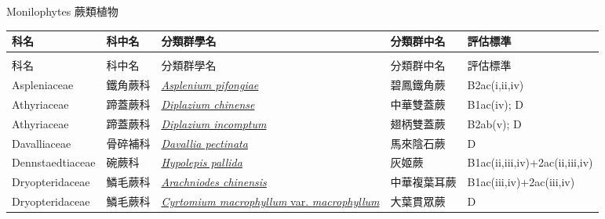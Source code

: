 \noindent\normalfont\selectfont Monilophytes 蕨類植物
\footnotesize\selectfont
        {\def\arraystretch{1.5}\tabcolsep=2pt
        \begin{longtable}{p{2.5cm}p{2.5cm}p{4.5cm}p{2.5cm}p{3cm}}
        \toprule
          科名 & 科中名 & 分類群學名 & 分類群中名 & 評估標準 \\
        \midrule 
        \endfirsthead

        \multicolumn{4}{l}{\bfseries\Large\color{red}{國家瀕危 (NEN) 類別維管束植物名錄(續)}} \\
        \toprule
        科名 & 科中名 & 分類群學名 & 分類群中名 & 評估標準 \\
        \midrule
        \endhead
                Aspleniaceae & 鐵角蕨科 & \href{http://www.theplantlist.org/tpl1.1/search?q=Asplenium+pifongiae}{\textit{Asplenium pifongiae} } & 碧鳳鐵角蕨 & B2ac(i,ii,iv) \index{Asplenium@\textit{Asplenium}!pifongiae@\textit{pifongiae}}  \index{碧鳳鐵角蕨} \\
    Athyriaceae & 蹄蓋蕨科 & \href{http://www.theplantlist.org/tpl1.1/search?q=Diplazium+chinense}{\textit{Diplazium chinense} } & 中華雙蓋蕨 & B1ac(iv); D \index{Diplazium@\textit{Diplazium}!chinense@\textit{chinense}}  \index{中華雙蓋蕨} \\
    Athyriaceae & 蹄蓋蕨科 & \href{http://www.theplantlist.org/tpl1.1/search?q=Diplazium+incomptum}{\textit{Diplazium incomptum} } & 翅柄雙蓋蕨 & B2ab(v); D \index{Diplazium@\textit{Diplazium}!incomptum@\textit{incomptum}}  \index{翅柄雙蓋蕨} \\
    Davalliaceae & 骨碎補科 & \href{http://www.theplantlist.org/tpl1.1/search?q=Davallia+pectinata}{\textit{Davallia pectinata} } & 馬來陰石蕨 & D \index{Davallia@\textit{Davallia}!pectinata@\textit{pectinata}}  \index{馬來陰石蕨} \\
    Dennstaedtiaceae & 碗蕨科 & \href{http://www.theplantlist.org/tpl1.1/search?q=Hypolepis+pallida}{\textit{Hypolepis pallida} } & 灰姬蕨 & B1ac(ii,iii,iv)+2ac(ii,iii,iv) \index{Hypolepis@\textit{Hypolepis}!pallida@\textit{pallida}}  \index{灰姬蕨} \\
    Dryopteridaceae & 鱗毛蕨科 & \href{http://www.theplantlist.org/tpl1.1/search?q=Arachniodes+chinensis}{\textit{Arachniodes chinensis} } & 中華複葉耳蕨 & B1ac(iii,iv)+2ac(iii,iv) \index{Arachniodes@\textit{Arachniodes}!chinensis@\textit{chinensis}}  \index{中華複葉耳蕨} \\
    Dryopteridaceae & 鱗毛蕨科 & \href{http://www.theplantlist.org/tpl1.1/search?q=Cyrtomium+macrophyllum+var.+macrophyllum}{\textit{Cyrtomium macrophyllum} var. \textit{macrophyllum} } & 大葉貫眾蕨 & D \index{Cyrtomium@\textit{Cyrtomium}!macrophyllum@\textit{macrophyllum}!var. macrophyllum@var. \textit{macrophyllum}}  \index{大葉貫眾蕨} \\

\end{longtable}}

